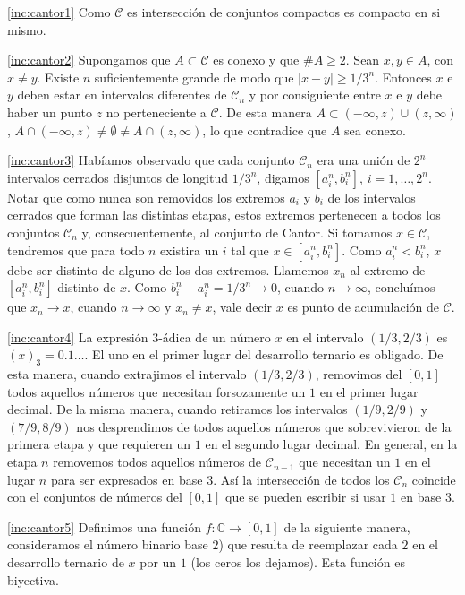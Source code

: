  \begin{demo} \ref{inc:cantor1} Como  $\mathscr{C}$ es intersección de conjuntos compactos es compacto en si mismo. 
  
  \ref{inc:cantor2} Supongamos que  $A\subset\mathscr{C}$ es conexo y que $\#A\geq 2$. Sean $x,y\in A$, con $x\neq y$. Existe $n$ suficientemente grande de modo que $|x-y|\geq 1/3^n$. Entonces $x$ e $y$ deben estar en intervalos diferentes de $\mathscr{C}_n$ y por consiguiente entre $x$ e $y$ debe haber un punto $z$ no perteneciente a $\mathscr{C}$. De esta manera $A\subset (-\infty,z)\cup (z,\infty)$, $A\cap(-\infty,z)\neq\emptyset\neq A\cap (z,\infty)$, lo que contradice que $A$ sea conexo.
 
  \ref{inc:cantor3} Habíamos observado  que cada conjunto $\mathscr{C}_n$ era una unión de $2^n$ intervalos cerrados disjuntos de longitud $1/3^n$, digamos $[a^n_i,b^n_i]$, $i=1,\ldots,2^n$. Notar que como nunca son removidos los extremos $a_i$ y $b_i$ de los intervalos cerrados que forman las distintas etapas, estos extremos pertenecen a todos los conjuntos $\mathscr{C}_n$ y, consecuentemente, al conjunto de Cantor. Si tomamos $x\in\mathscr{C}$, tendremos que para todo $n$ existira un $i$ tal que $x\in[a^n_i,b^n_i]$. Como $a^n_i<b^n_i$, $x$ debe ser distinto de alguno de los dos extremos. Llamemos $x_n$ al extremo de $[a^n_i,b^n_i]$ distinto de $x$. Como $b^n_i-a^n_i=1/3^n\to 0$, cuando $n\to\infty$, concluímos que $x_n\to x$, cuando $n\to\infty$ y $x_n\neq x$, vale decir $x$ es punto de acumulación de $\mathscr{C}$.  
  
  \ref{inc:cantor4} La expresión $3$-ádica de un número $x$ en el intervalo $(1/3,2/3)$ es $(x)_3=0.1\ldots$. El uno en el primer lugar del desarrollo ternario es obligado. De esta manera, cuando extrajimos el intervalo $(1/3,2/3)$, removimos del $[0,1]$ todos aquellos números que necesitan forsozamente un $1$ en el primer lugar decimal. De la misma manera, cuando retiramos los intervalos $(1/9,2/9)$ y $(7/9,8/9)$ nos desprendimos de todos aquellos números que sobrevivieron de la primera etapa y que requieren un $1$ en el segundo lugar decimal. En general, en la etapa $n$ removemos todos aquellos números de $\mathscr{C}_{n-1}$ que necesitan un $1$ en el lugar $n$ para ser expresados en base $3$. Así la intersección de todos los $\mathscr{C}_n$ coincide con el conjuntos de números del $[0,1]$ que se pueden escribir si usar $1$ en base $3$.
  
  \ref{inc:cantor5} Definimos una función $f:\mathbb{C}\to [0,1]$ de la siguiente manera, consideramos el número binario base $2$) que resulta de reemplazar cada $2$ en el desarrollo ternario de $x$ por un $1$ (los ceros los dejamos). Esta función es biyectiva.  
 \end{demo}


